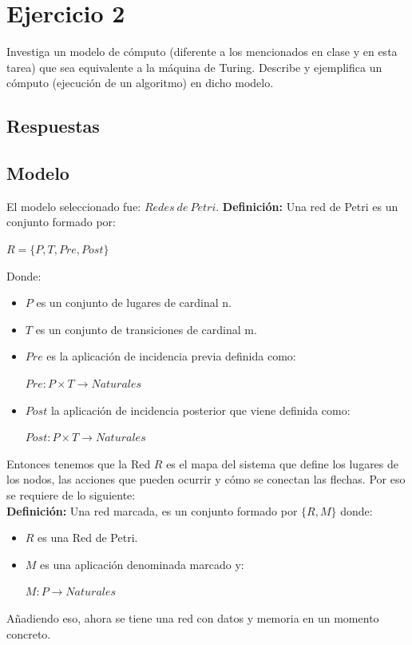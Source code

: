 \section{Ejercicio 2}


\begin{tcolorbox}[enunciado]
Investiga un modelo de cómputo (diferente a los mencionados en clase y en esta tarea) que sea equivalente a la máquina de Turing. Describe y ejemplifica un cómputo (ejecución de un algoritmo) en dicho modelo.

\end{tcolorbox}

\subsection{Respuestas}
\subsection{Modelo}
El modelo seleccionado fue: $Redes \ de \ Petri$. \textbf{Definición:} Una red de Petri es un conjunto formado por: \begin{center}
    $R=\{ P,T,Pre,Post \}$
\end{center}
Donde: \begin{itemize}
    \item $P$ es un conjunto de lugares de cardinal n.
    \item $T$ es un conjunto de transiciones de cardinal m.
    \item $Pre$ es la aplicación de incidencia previa definida como: \begin{center}
        $Pre:P\times T \to Naturales$
    \end{center}
    \item $Post$ la aplicación de incidencia posterior que viene definida como: \begin{center}
        $Post:P\times T \to Naturales$
    \end{center}
\end{itemize}
Entonces tenemos que la Red $R$ es el mapa del sistema que define los lugares de los nodos, las acciones que pueden ocurrir y cómo se conectan las flechas. Por eso se requiere de lo siguiente:\\
\textbf{Definición:} Una red marcada, es un conjunto formado por $\{ R,M \}$ donde:\begin{itemize}
    \item $R$ es una Red de Petri.
    \item $M$ es una aplicación denominada marcado y: \begin{center}
        $M:P\to Naturales$
    \end{center}
\end{itemize}
Añadiendo eso, ahora se tiene una red con datos y memoria en un momento concreto. 

